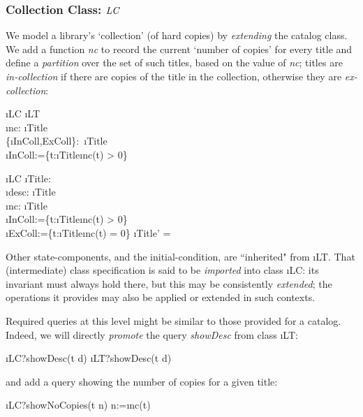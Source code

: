 \documentclass[12pt,a4paper]{article}
\begin{document}
\subsubsection*{Collection Class: $\mathit{LC}$}

We model a library's `collection' (of hard copies) by \emph{extending} the catalog class.
We add a function \emph{nc} to record the current `number of copies'
for every title and define a \emph{partition} over the set of such titles, based on the value of \emph{nc};
titles are \emph{in-collection} if there are copies of the title in the collection,
otherwise they are \emph{ex-collection}:
\begin{showspecs}
	\begin{spec}{\i{LC}}
		\i{LT}\\[0.5ex]
		\i{nc}: \i{Title} \tfun {}\\[0.5ex]
		\{\i{InColl,ExColl}\}: \,\i{Title}\\
		\i{InColl}:=\!\{t\!:\!\i{Title}\bullet\i{nc}(t) > 0\}
	\end{spec}
\showbeside
	\begin{spec}[\equiv]{\i{LC}}
		\i{Title}: \;\\
		\i{desc}: \i{Title} \tfun {}\\
		\i{nc}: \i{Title} \tfun {}\\
		\i{InColl}:=\!\{t\!:\!\i{Title}\bullet\i{nc}(t) > 0\}\\
		\i{ExColl}\!:=\!\{t\!:\!\i{Title}\bullet\i{nc}(t) = 0\}
	\post	\i{Title'} = \emptyset
	\end{spec}
\end{showspecs}
\noindent Other state-components, and the initial-condition, are
``inherited" from \i{LT}. That (intermediate) class specification
is said to be \emph{imported} into class \i{LC}: its invariant must
always hold there, but this may be consistently \emph{extended};
the operations it provides may also be applied or extended
in such contexts.

\smallskip\noindent Required queries at this level might be similar
to those provided for a catalog.
Indeed, we will directly \emph{promote} the query \emph{showDesc} from class \i{LT}:
\begin{showspecs}
	\begin{spec}{\i{LC?showDesc(t \to d)}}
		\i{LT?showDesc(t \to d)}
	\end{spec}
\end{showspecs}
\noindent and add a query showing the number of copies for a given title:
\begin{showspecs}
	\begin{spec}{\i{LC?showNoCopies(t \to n)}}
		n:=\i{nc}(t)
	\end{spec}
\end{showspecs}
\end{document}
